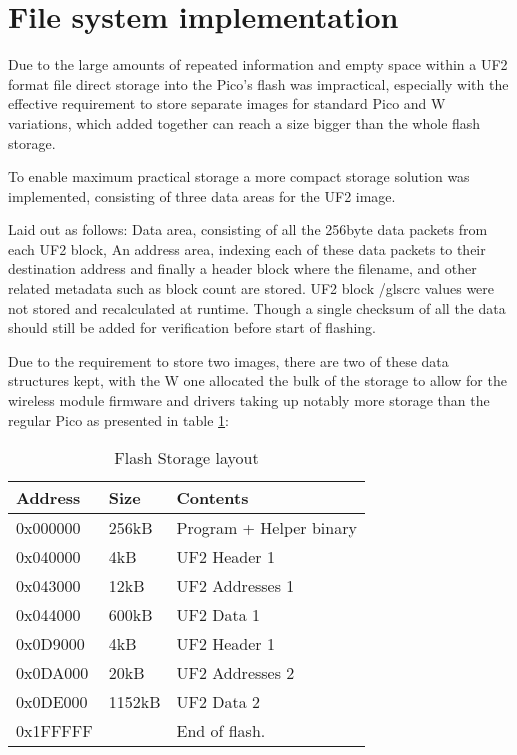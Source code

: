 \clearpage
\section{File system implementation}

Due to the large amounts of repeated information and empty space within a UF2 format file direct storage into the Pico's flash was impractical, especially with the effective requirement to store separate images for standard Pico and W variations, which added together can reach a size bigger than the whole flash storage.

To enable maximum practical storage a more compact storage solution was implemented, consisting of three data areas for the UF2 image.

Laid out as follows: Data area, consisting of all the 256byte data packets from each UF2 block, An address area, indexing each of these data packets to their destination address and finally a header block where the filename, and other related metadata such as block count are stored. UF2 block /gls{crc} values were not stored and recalculated at runtime. Though a single checksum of all the data should still be added for verification before start of flashing.

Due to the requirement to store two images, there are two of these data structures kept, with the W one allocated the bulk of the storage to allow for the wireless module firmware and drivers taking up notably more storage than the regular Pico as presented in table \ref{table:file_storage}:

\begin{table}[h]
	\centering
	\caption{Flash Storage layout}%
	\vspace{-16.5pt}%

		\begin{tabular}{|l|l|l|}
			\hline
			Address & Size  & Contents        \\ \hline
			0x000000 & 256kB & Program + Helper binary \\ \hline
			0x040000 & 4kB & UF2 Header 1      \\ \hline
			0x043000 & 12kB & UF2 Addresses 1 \\ \hline
			0x044000 & 600kB & UF2 Data 1 \\ \hline
			0x0D9000 & 4kB & UF2 Header 1 \\ \hline
			0x0DA000 & 20kB & UF2 Addresses 2      \\ \hline
			0x0DE000 & 1152kB & UF2 Data 2 \\ \hline
			0x1FFFFF & & End of flash. \\ \hline
		\end{tabular}
		\label{table:file_storage}
\end{table}

